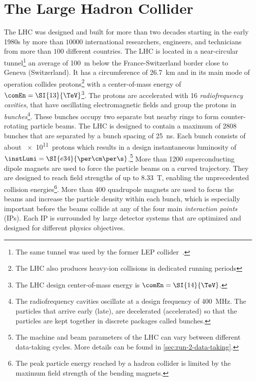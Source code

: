 \section{The Large Hadron Collider}
The LHC was designed and built for more than two decades starting in the early 1980s by more than $10000$ international researchers, engineers, and technicians from more than $100$ different countries.
The LHC is located in a near-circular tunnel\footnote{The same tunnel was used by the former LEP collider~\cite{LEPDesignReport}.} an average of \SI{100}{\m} below the France-Switzerland border close to Geneva (Switzerland). It has a circumference of \SI{26.7}{\km} and in its main mode of operation collides protons\footnote{The LHC also produces heavy-ion collisions in dedicated running periods} with a center-of-mass energy of $\comEn = \SI{13}{\TeV}$\footnote{The LHC design center-of-mass energy is $\comEn = \SI{14}{\TeV}$.}.
The protons are accelerated with 16 \emph{radiofrequency cavities}, that have oscillating electromagnetic fields and group the protons in \emph{bunches}\footnote{The radiofrequency cavities oscillate at a design frequency of \SI{400}{\mega\hertz}. The particles that arrive early (late), are decelerated (accelerated) so that the particles are kept together in discrete packages called bunches.}.
These bunches occupy two separate but nearby rings to form counter-rotating particle beams.
The LHC is designed to contain a maximum of 2808 bunches that are separated by a bunch spacing of \SI{25}{\ns}. Each bunch consists of about \SI{e11}{protons} which results in a design instantaneous luminosity of $\instLumi = \SI{e34}{\per\cm\per\s}$.\footnote{The machine and beam parameters of the LHC can vary between different data-taking cycles. More details can be found in \cref{sec:run-2-data-taking}.}
More than 1200 superconducting dipole magnets are used to force the particle beams on a curved trajectory.
They are designed to reach field strengths of up to \SI{8.33}{\tesla}, enabling the unprecedented collision energies\footnote{The peak particle energy reached by a hadron collider is limited by the maximum field strength of the bending magnets.}. More than 400 quadrupole magnets are used to focus the beams and increase the particle density within each bunch, which is especially important before the beams collide at any of the four main \emph{interaction points} (IPs). Each IP is surrounded by large detector systems that are optimized and designed for different physics objectives.
